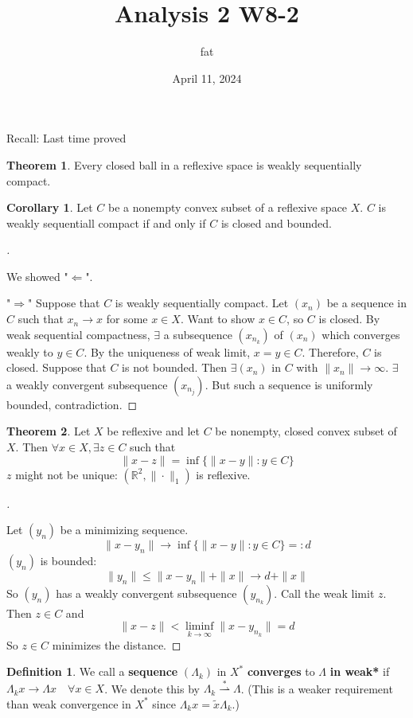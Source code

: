 \documentclass{article}
\title{Analysis 2 W8-2}
\author{fat}
\date{April 11, 2024}
\theoremstyle{definition}
\newtheorem{thm}{Theorem}
\newtheorem{dfn}{Definition}
\newtheorem{cor}{Corollary}
\newenvironment{proofs}[1][\proofname]{%
  \begin{proof}[#1]$ $\par\nobreak\ignorespaces
}{%
  \end{proof}
}
\newcommand{\RR}{\mathbb R}
\newcommand{\Ra}{\Rightarrow}
\newcommand{\La}{\Leftarrow}
\newcommand{\ru}{\rightharpoonup}
\begin{document}
\maketitle
\thispagestyle{fancy}
\renewcommand{\footrulewidth}{0.4pt}
\cfoot{\thepage}
\renewcommand{\headrulewidth}{0.4pt}

Recall: Last time proved
\begin{thm}
	Every closed ball in a reflexive space is weakly sequentially compact.
\end{thm}

\begin{cor}
	Let $C$ be a nonempty convex subset of a reflexive space $X$.
	$C$ is weakly sequentiall compact if and only if $C$ is closed and bounded.
\end{cor}

\begin{proofs}
	We showed "$\La$".
	\par "$\Ra$" Suppose that $C$ is weakly sequentially compact.
	Let $(x_n)$ be a sequence in $C$ such that $x_n \to x$ for some $x \in X$.
	Want to show $x \in C$, so $C$ is closed.
	By weak sequential compactness, $\exists$ a subsequence $(x_{n_k})$ of $(x_n)$ which converges weakly to $y \in C$.
	By the uniqueness of weak limit, $x = y \in C$.
	Therefore, $C$ is closed.
	Suppose that $C$ is not bounded.
	Then $\exists (x_n)$ in $C$ with $\|x_n\| \to \infty$.
	$\exists$ a weakly convergent subsequence $(x_{n_j})$.
	But such a sequence is uniformly bounded, contradiction.
\end{proofs}

\begin{thm}
	Let $X$ be reflexive and let $C$ be nonempty, closed convex subset of $X$.
	Then $\forall x \in X, \exists z \in C$ such that
	\[
		\|x - z\| = \inf\{ \|x - y\|: y \in C\}
	\]
	$z$ might not be unique: $(\RR^2, \|\cdot\|_1)$ is reflexive.
\end{thm}

\begin{proofs}
	Let $(y_n)$ be a minimizing sequence.
	\[
		\|x - y_n\| \to \inf\{ \|x - y\|: y \in C\} =: d
	\]
	$(y_n)$ is bounded:
	\[
		\|y_n\| \leq \|x - y_n\| + \|x\| \to d + \|x\|
	\]
	So $(y_n)$ has a weakly convergent subsequence $(y_{n_k})$.
	Call the weak limit $z$.
	Then $z \in C$ and 
	\[
		\|x - z\| < \liminf_{k \to \infty} \|x - y_{n_k}\| = d
	\]
	So $z \in C$ minimizes the distance.
\end{proofs}

\begin{dfn}
	We call a \textbf{sequence} $(\Lambda_k)$ in $X^*$ \textbf{converges} to $\Lambda$ \textbf{in weak*} if $\Lambda_k x \to \Lambda x \quad \forall x \in X$.
	We denote this by $\Lambda_k \stackrel{*}{\ru} \Lambda$.
	(This is a weaker requirement than weak convergence in $X^*$ since $\Lambda_k x = \tilde{x} \Lambda_k$.)
\end{dfn}
\end{document}
